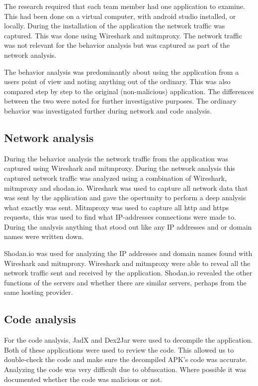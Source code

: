 The research required that each team member had one application to examine.
This had been done on a virtual computer, with android studio installed, or locally.
During the installation of the application the network traffic was captured.
This was done using Wireshark and mitmproxy.
The network traffic was not relevant for the behavior analysis but was captured as part of the network analysis.

The behavior analysis was predominantly about using the application from a users point of view and noting anything out of the ordinary.
This was also compared step by step to the original (non-malicious) application.
The differences between the two were noted for further investigative purposes.
The ordinary behavior was investigated further during network and code analysis.

\subsection{Network analysis}

During the behavior analysis the network traffic from the application was captured using Wireshark and mitmproxy.
During the network analysis this captured network traffic was analyzed using a combination of Wireshark, mitmproxy and shodan.io.
Wireshark was used to capture all network data that was sent by the application and gave the opertunity to perform a deep analysis what exactly was sent.
Mitmproxy was used to capture all http and https requests, this was used to find what IP-addresses connections were made to.
During the analysis anything that stood out like any IP addresses and or domain names were written down.

Shodan.io was used for analyzing the IP addresses and domain names found with Wireshark and mitmproxy.
Wireshark and mitmproxy were able to reveal all the network traffic sent and received by the application.
Shodan.io revealed the other functions of the servers and whether there are similar servers, perhaps from the same hosting provider.

\subsection{Code analysis}

For the code analysis, JadX and Dex2Jar were used to decompile the application. 
Both of these applications were used to review the code. 
This allowed us to double-check the code and make sure the decompiled APK's code was accurate. 
Analyzing the code was very difficult due to obfuscation. 
Where possible it was documented whether the code was malicious or not.

